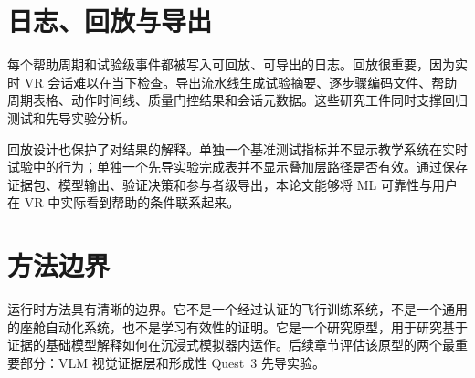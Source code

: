 \section{日志、回放与导出}\label{sec:design-replay}

每个帮助周期和试验级事件都被写入可回放、可导出的日志。回放很重要，因为实时 VR 会话难以在当下检查。导出流水线生成试验摘要、逐步骤编码文件、帮助周期表格、动作时间线、质量门控结果和会话元数据。这些研究工件同时支撑回归测试和先导实验分析。

回放设计也保护了对结果的解释。单独一个基准测试指标并不显示教学系统在实时试验中的行为；单独一个先导实验完成表并不显示叠加层路径是否有效。通过保存证据包、模型输出、验证决策和参与者级导出，本论文能够将 ML 可靠性与用户在 VR 中实际看到帮助的条件联系起来。

\section{方法边界}\label{sec:design-boundary}

运行时方法具有清晰的边界。它不是一个经过认证的飞行训练系统，不是一个通用的座舱自动化系统，也不是学习有效性的证明。它是一个研究原型，用于研究基于证据的基础模型解释如何在沉浸式模拟器内运作。后续章节评估该原型的两个最重要部分：VLM 视觉证据层和形成性 Quest~3 先导实验。
